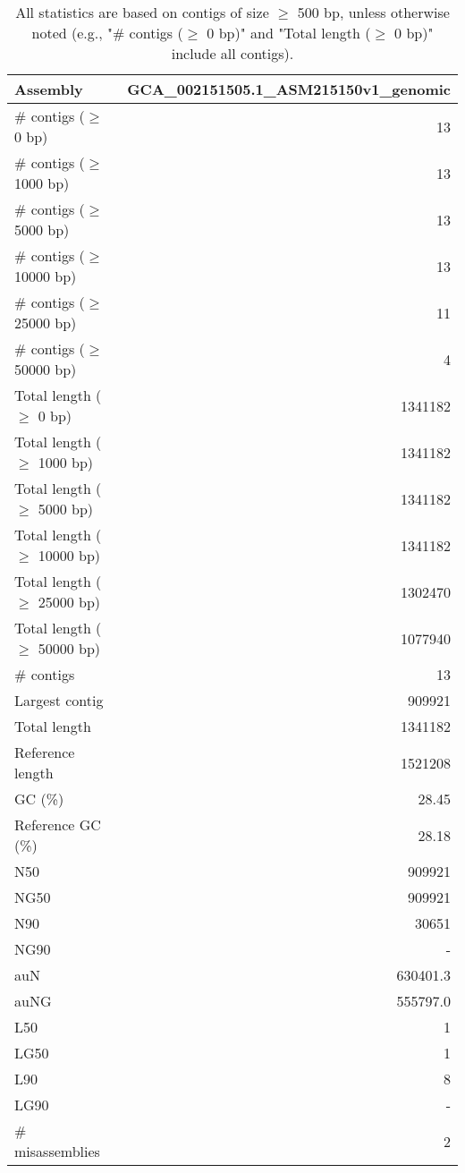 \documentclass[12pt,a4paper]{article}
\begin{document}
\begin{table}[ht]
\begin{center}
\caption{All statistics are based on contigs of size $\geq$ 500 bp, unless otherwise noted (e.g., "\# contigs ($\geq$ 0 bp)" and "Total length ($\geq$ 0 bp)" include all contigs).}
\begin{tabular}{|l*{1}{|r}|}
\hline
Assembly & GCA\_002151505.1\_ASM215150v1\_genomic \\ \hline
\# contigs ($\geq$ 0 bp) & 13 \\ \hline
\# contigs ($\geq$ 1000 bp) & 13 \\ \hline
\# contigs ($\geq$ 5000 bp) & 13 \\ \hline
\# contigs ($\geq$ 10000 bp) & 13 \\ \hline
\# contigs ($\geq$ 25000 bp) & 11 \\ \hline
\# contigs ($\geq$ 50000 bp) & 4 \\ \hline
Total length ($\geq$ 0 bp) & 1341182 \\ \hline
Total length ($\geq$ 1000 bp) & 1341182 \\ \hline
Total length ($\geq$ 5000 bp) & 1341182 \\ \hline
Total length ($\geq$ 10000 bp) & 1341182 \\ \hline
Total length ($\geq$ 25000 bp) & 1302470 \\ \hline
Total length ($\geq$ 50000 bp) & 1077940 \\ \hline
\# contigs & 13 \\ \hline
Largest contig & 909921 \\ \hline
Total length & 1341182 \\ \hline
Reference length & 1521208 \\ \hline
GC (\%) & 28.45 \\ \hline
Reference GC (\%) & 28.18 \\ \hline
N50 & 909921 \\ \hline
NG50 & 909921 \\ \hline
N90 & 30651 \\ \hline
NG90 & - \\ \hline
auN & 630401.3 \\ \hline
auNG & 555797.0 \\ \hline
L50 & 1 \\ \hline
LG50 & 1 \\ \hline
L90 & 8 \\ \hline
LG90 & - \\ \hline
\# misassemblies & 2 \\ \hline

\end{tabular}
\end{center}
\end{table}
\end{document}
